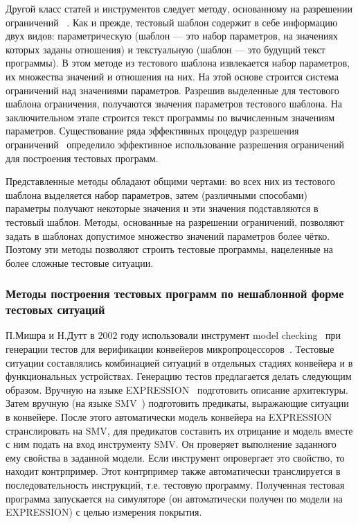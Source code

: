 
Другой класс статей и инструментов следует методу, основанному на разрешении ограничений ~\cite{GenesysPro, GenesysPro2004Innovations, DeepTrans, RAVEN, MAATG}. Как и прежде, тестовый шаблон содержит в себе информацию двух видов: параметрическую (шаблон --- это набор параметров, на значениях которых заданы отношения) и текстуальную (шаблон --- это будущий текст программы). В этом методе из тестового шаблона извлекается набор параметров, их множества значений и отношения на них. На этой основе строится система ограничений над значениями параметров. Разрешив выделенные для тестового шаблона ограничения, получаются значения параметров тестового шаблона. На заключительном этапе строится текст программы по вычисленным значениям параметров. Существование ряда эффективных процедур разрешения ограничений~\cite{CLPusingECLiPSe, SMT} определило эффективное использование разрешения ограничений для построения тестовых программ.

Представленные методы обладают общими чертами: во всех них из тестового шаблона выделяется набор параметров, затем (различными способами) параметры получают некоторые значения и эти значения подставляются в тестовый шаблон. Методы, основанные на разрешении ограничений, позволяют задать в шаблонах допустимое множество значений параметров более чётко. Поэтому эти методы позволяют строить тестовые программы, нацеленные на более сложные тестовые ситуации.

\subsubsection{Методы построения тестовых программ по нешаблонной форме тестовых ситуаций}%

П.Мишра и Н.Дутт в 2002 году использовали инструмент model checking~\cite{ModelChecking} при генерации тестов для верификации конвейеров микропроцессоров~\cite{MishraDutt02}. Тестовые ситуации составлялись комбинацией ситуаций в отдельных стадиях конвейера и в функциональных устройствах. Генерацию тестов предлагается делать следующим образом. Вручную на языке EXPRESSION~\cite{EXPRESSION} подготовить описание архитектуры. Затем вручную (на языке SMV~\cite{SMV}) подготовить предикаты, выражающие ситуации в конвейере. После этого автоматически модель конвейера на EXPRESSION странслировать на SMV, для предикатов составить их отрицание и модель вместе с ним подать на вход инструменту SMV. Он проверяет выполнение заданного ему свойства в заданной модели. Если инструмент опровергает это свойство, то находит контрпример. Этот контрпример также автоматически транслируется в последовательность инструкций, т.е. тестовую программу. Полученная тестовая программа запускается на симуляторе (он автоматически получен по модели на EXPRESSION) с целью измерения покрытия.

